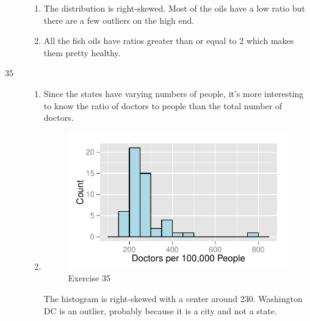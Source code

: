 \documentclass[letterpaper, landscape]{exam}
\begin{document}
\begin{description}
\begin{enumerate}[{a}]
          \item The distribution is right-skewed.  Most of the oils have a low
            ratio but there are a few outliers on the high end.

          \item All the fish oils have ratios greater than or equal to 2 which
          makes them pretty healthy.

        \end{enumerate}

      \pagebreak

      \item[35]
        \begin{enumerate}[{a}]
          \item Since the states have varying numbers of people, it's more
          interesting to know the ratio of doctors to people than the total
          number of doctors.

          \item 
            \begin{figure}[H]
              \centering
              \includegraphics{figures/ex35.pdf}
              \caption{Exercise 35}
            \end{figure}

            The histogram is right-skewed with a center around 230.  Washington
            DC is an outlier, probably because it is a city and not a state.

        \end{enumerate}



\end{description}
\end{document}
